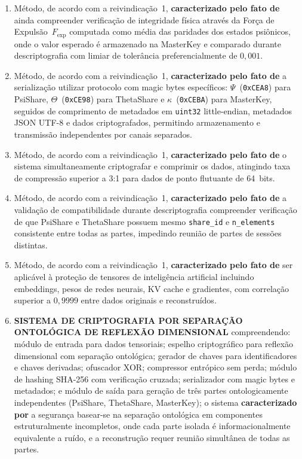 \documentclass[12pt,a4paper]{article}
\newcommand{\Fexp}{F_{\text{exp}}}
\begin{document}
\begin{enumerate}
\item Método, de acordo com a reivindicação~1,
\textbf{caracterizado pelo fato de} ainda compreender
verificação de integridade física através da Força de
Expulsão~$\Fexp$ computada como média das paridades dos estados
psiônicos, onde o valor esperado é armazenado na MasterKey e
comparado durante descriptografia com limiar de tolerância
preferencialmente de $0{,}001$.

\item Método, de acordo com a reivindicação~1,
\textbf{caracterizado pelo fato de} a serialização utilizar
protocolo com magic bytes específicos:
$\Psi$~(\texttt{0xCEA8}) para PsiShare,
$\Theta$~(\texttt{0xCE98}) para ThetaShare e
$\kappa$~(\texttt{0xCEBA}) para MasterKey, seguidos de
comprimento de metadados em \texttt{uint32} little-endian,
metadados JSON UTF-8 e dados criptografados, permitindo
armazenamento e transmissão independentes por canais separados.

\item Método, de acordo com a reivindicação~1,
\textbf{caracterizado pelo fato de} o sistema simultaneamente
criptografar e comprimir os dados, atingindo taxa de compressão
superior a 3:1 para dados de ponto flutuante de 64~bits.

\item Método, de acordo com a reivindicação~1,
\textbf{caracterizado pelo fato de} a validação de
compatibilidade durante descriptografia compreender verificação
de que PsiShare e ThetaShare possuem mesmo \texttt{share\_id} e
\texttt{n\_elements} consistente entre todas as partes,
impedindo reunião de partes de sessões distintas.

\item Método, de acordo com a reivindicação~1,
\textbf{caracterizado pelo fato de} ser aplicável à proteção de
tensores de inteligência artificial incluindo embeddings, pesos
de redes neurais, KV cache e gradientes, com correlação superior
a $0{,}9999$ entre dados originais e reconstruídos.

\item \textbf{SISTEMA DE CRIPTOGRAFIA POR SEPARAÇÃO ONTOLÓGICA
DE REFLEXÃO DIMENSIONAL} compreendendo: módulo de entrada para
dados tensoriais; espelho criptográfico para reflexão
dimensional com separação ontológica; gerador de chaves para
identificadores e chaves derivadas; ofuscador XOR; compressor
entrópico sem perda; módulo de hashing SHA-256 com verificação
cruzada; serializador com magic bytes e metadados; e módulo de
saída para geração de três partes ontologicamente independentes
(PsiShare, ThetaShare, MasterKey); o sistema
\textbf{caracterizado por} a segurança basear-se na separação
ontológica em componentes estruturalmente incompletos, onde cada
parte isolada é informacionalmente equivalente a ruído, e a
reconstrução requer reunião simultânea de todas as partes.


\end{enumerate}
\end{document}
